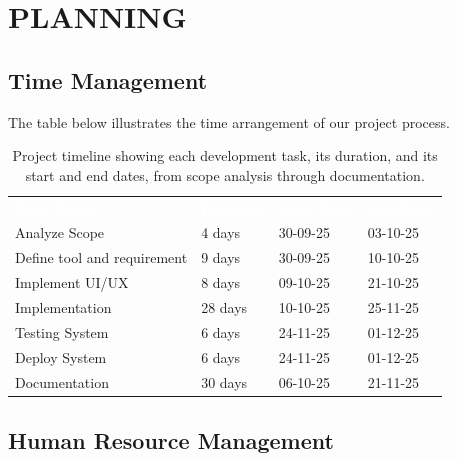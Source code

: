 \section{PLANNING}
\label{sec:planning}

\subsection{Time Management}
\label{sub:time-management}

The table below illustrates the time arrangement of our project process.

\begin{table}[H]
\centering
\caption{Project timeline showing each development task, its duration, and its start and end dates, from scope analysis through documentation.}
\label{tab:schedule}
\small
\begin{tabularx}{\linewidth}{L{4.6cm} C{2.4cm} C{2.6cm} Z}
\textcolor{white}{\textbf{Task Name}} & \textcolor{white}{\textbf{Duration}} & \textcolor{white}{\textbf{Start Date}} & \textcolor{white}{\textbf{End Date}} \\
Analyze Scope               & 4 days  & 30-09-25 & 03-10-25 \\
Define tool and requirement & 9 days  & 30-09-25 & 10-10-25 \\
Implement UI/UX             & 8 days  & 09-10-25 & 21-10-25 \\
Implementation              & 28 days & 10-10-25 & 25-11-25 \\
Testing System              & 6 days  & 24-11-25 & 01-12-25 \\
Deploy System               & 6 days  & 24-11-25 & 01-12-25 \\
Documentation               & 30 days & 06-10-25 & 21-11-25 \\
\end{tabularx}
\end{table}

\subsection{Human Resource Management}
\label{sub:human-resource-management}

